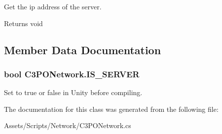 Get the ip address of the server.

\begin{DoxyReturn}{Returns}
void
\end{DoxyReturn}


\subsection{Member Data Documentation}
\hypertarget{class_c3_p_o_network_a2fd6f3b169659bd58cf47a159c8d38a8}{
\subsubsection[{I\-S\-\_\-\-S\-E\-R\-V\-E\-R}]{\setlength{\rightskip}{0pt plus 5cm}bool C3\-P\-O\-Network.\-I\-S\-\_\-\-S\-E\-R\-V\-E\-R}}\label{class_c3_p_o_network_a2fd6f3b169659bd58cf47a159c8d38a8}


Set to true or false in Unity before compiling.



The documentation for this class was generated from the following file\-:\begin{DoxyCompactItemize}
\item 
Assets/\-Scripts/\-Network/C3\-P\-O\-Network.\-cs\end{DoxyCompactItemize}
